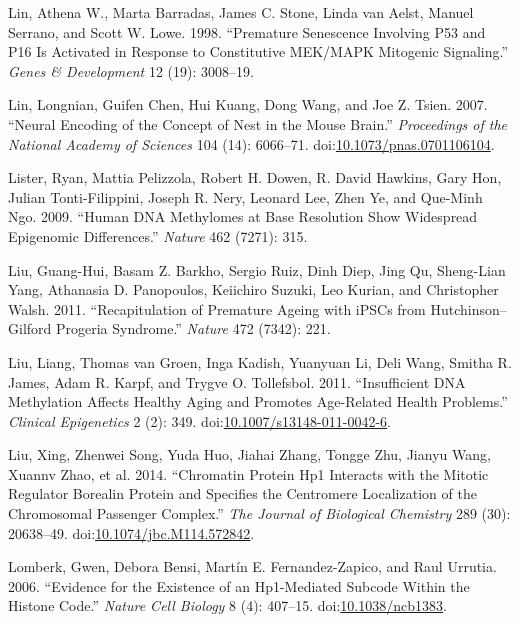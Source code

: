 \documentclass[onehalf,12pt]{beavtex}
\begin{document}
  \hypertarget{ref-LinPrematuresenescenceinvolving1998}{}
  Lin, Athena W., Marta Barradas, James C. Stone, Linda van Aelst, Manuel
  Serrano, and Scott W. Lowe. 1998. ``Premature Senescence Involving P53
  and P16 Is Activated in Response to Constitutive MEK/MAPK Mitogenic
  Signaling.'' \emph{Genes \& Development} 12 (19): 3008--19.
  
  \hypertarget{ref-LinNeuralencodingconcept2007}{}
  Lin, Longnian, Guifen Chen, Hui Kuang, Dong Wang, and Joe Z. Tsien.
  2007. ``Neural Encoding of the Concept of Nest in the Mouse Brain.''
  \emph{Proceedings of the National Academy of Sciences} 104 (14):
  6066--71.
  doi:\href{https://doi.org/10.1073/pnas.0701106104}{10.1073/pnas.0701106104}.
  
  \hypertarget{ref-ListerHumanDNAmethylomes2009}{}
  Lister, Ryan, Mattia Pelizzola, Robert H. Dowen, R. David Hawkins, Gary
  Hon, Julian Tonti-Filippini, Joseph R. Nery, Leonard Lee, Zhen Ye, and
  Que-Minh Ngo. 2009. ``Human DNA Methylomes at Base Resolution Show
  Widespread Epigenomic Differences.'' \emph{Nature} 462 (7271): 315.
  
  \hypertarget{ref-LiuRecapitulationprematureageing2011}{}
  Liu, Guang-Hui, Basam Z. Barkho, Sergio Ruiz, Dinh Diep, Jing Qu,
  Sheng-Lian Yang, Athanasia D. Panopoulos, Keiichiro Suzuki, Leo Kurian,
  and Christopher Walsh. 2011. ``Recapitulation of Premature Ageing with
  iPSCs from Hutchinson--Gilford Progeria Syndrome.'' \emph{Nature} 472
  (7342): 221.
  
  \hypertarget{ref-LiuInsufficientDNAmethylation2011}{}
  Liu, Liang, Thomas van Groen, Inga Kadish, Yuanyuan Li, Deli Wang,
  Smitha R. James, Adam R. Karpf, and Trygve O. Tollefsbol. 2011.
  ``Insufficient DNA Methylation Affects Healthy Aging and Promotes
  Age-Related Health Problems.'' \emph{Clinical Epigenetics} 2 (2): 349.
  doi:\href{https://doi.org/10.1007/s13148-011-0042-6}{10.1007/s13148-011-0042-6}.
  
  \hypertarget{ref-LiuChromatinproteinHP12014}{}
  Liu, Xing, Zhenwei Song, Yuda Huo, Jiahai Zhang, Tongge Zhu, Jianyu
  Wang, Xuannv Zhao, et al. 2014. ``Chromatin Protein Hp1 Interacts with
  the Mitotic Regulator Borealin Protein and Specifies the Centromere
  Localization of the Chromosomal Passenger Complex.'' \emph{The Journal
  of Biological Chemistry} 289 (30): 20638--49.
  doi:\href{https://doi.org/10.1074/jbc.M114.572842}{10.1074/jbc.M114.572842}.
  
  \hypertarget{ref-LomberkEvidenceexistenceHP1mediated2006}{}
  Lomberk, Gwen, Debora Bensi, Martín E. Fernandez-Zapico, and Raul
  Urrutia. 2006. ``Evidence for the Existence of an Hp1-Mediated Subcode
  Within the Histone Code.'' \emph{Nature Cell Biology} 8 (4): 407--15.
  doi:\href{https://doi.org/10.1038/ncb1383}{10.1038/ncb1383}.
  
\end{document}
